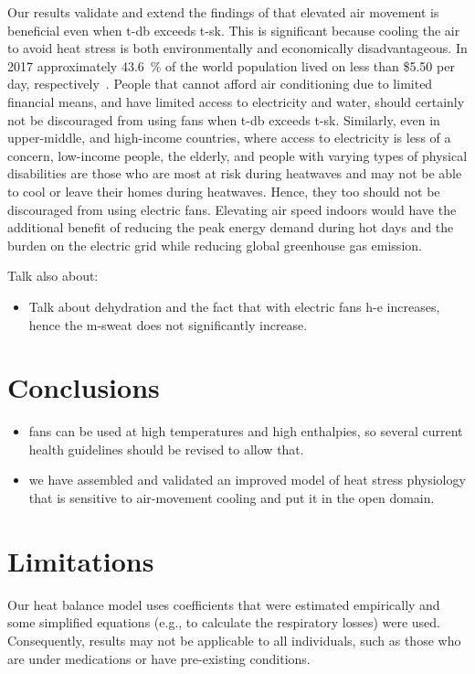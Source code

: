 Our results validate and extend the findings of  that elevated air movement is beneficial even when \ac{t-db} exceeds \acf{t-sk}.
This is significant because cooling the air to avoid heat stress is both environmentally and economically disadvantageous.
In 2017 approximately 43.6~\% of the world population lived on less than \$5.50 per day, respectively~\cite{PovertyO1:online}.
People that cannot afford air conditioning due to limited financial means, and have limited access to electricity and water, should certainly not be discouraged from using fans when \ac{t-db} exceeds \ac{t-sk}.
Similarly, even in upper-middle, and high-income countries, where access to electricity is less of a concern, low-income people, the elderly, and people with varying types of physical disabilities are those who are most at risk during heatwaves and may not be able to cool or leave their homes during heatwaves.
Hence, they too should not be discouraged from using electric fans.
Elevating air speed indoors would have the additional benefit of reducing the peak energy demand during hot days and the burden on the electric grid while reducing global greenhouse gas emission.

Talk also about:
\begin{itemize}
    \item Talk about dehydration and the fact that with electric fans \ac{h-e} increases, hence the \ac{m-sweat} does not significantly increase. %
\end{itemize}

\section{Conclusions}\label{sec:conclusions}
\begin{itemize}
    \item fans can be used at high temperatures and high enthalpies, so several current health guidelines should be revised to allow that.
    \item we have assembled and validated an improved model of heat stress physiology that is sensitive to air-movement cooling and put it in the open domain.
\end{itemize}


\section*{Limitations}
Our heat balance model uses coefficients that were estimated empirically and some simplified equations (e.g., to calculate the respiratory losses) were used.
Consequently, results may not be applicable to all individuals, such as those who are under medications or have pre-existing conditions.
